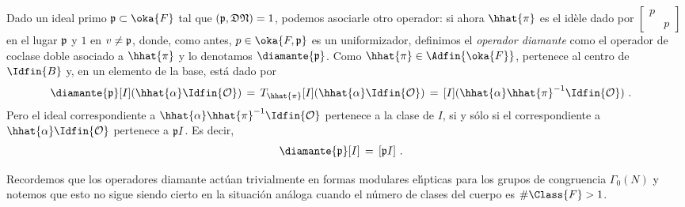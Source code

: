 Dado un ideal primo $\frak{p}\subset\oka{F}$ tal que
$(\frak{p},\frak{D}\frak{N})=1$, podemos asociarle otro operador: si ahora
$\hhat{\pi}$ es el id\`{e}le dado por
\begin{math}
	\begin{bmatrix} p & \\ & p \end{bmatrix}
\end{math}
en el lugar $\frak{p}$ y $1$ en $v\not =\frak{p}$, donde, como antes,
$p\in\oka{F,\frak{p}}$ es un uniformizador, definimos el \emph{operador %
diamante}
como el operador de coclase doble asociado a $\hhat{\pi}$ y lo denotamos
$\diamante{\frak{p}}$. Como $\hhat{\pi}\in\Adfin{\oka{F}}$, pertenece al centro
de $\Idfin{B}$ y, en un elemento de la base, est\'{a} dado por
\begin{align*}
	\diamante{\frak{p}} [I] (\hhat{\alpha}\Idfin{\cal{O}}) & \,=\,
		T_{\hhat{\pi}}[I]
			(\hhat{\alpha}\Idfin{\cal{O}})
		\,=\,[I](\hhat{\alpha}\hhat{\pi}^{-1}\Idfin{\cal{O}})
	\text{ .}
\end{align*}
%
Pero el ideal correspondiente a $\hhat{\alpha}\hhat{\pi}^{-1}\Idfin{\cal{O}}$
pertenece a la clase de $I$, si y s\'{o}lo si el correspondiente a
$\hhat{\alpha}\Idfin{\cal{O}}$ pertenece a $\frak{p}I$.
Es decir,
\begin{align*}
	\diamante{\frak{p}} [I] & \,=\, [\frak{p}I]
	\text{ .}
\end{align*}
%

\begin{obsDiamanteParaDefinidos}\label{obs:diamanteparadefinidos}
	Recordemos que los operadores diamante act\'{u}an trivialmente en
	formas modulares el\'{\i}pticas para los grupos de congruencia
	$\Gamma_{0}(N)$ y notemos que esto no sigue siendo cierto en la
	situaci\'{o}n an\'{a}loga cuando el n\'{u}mero de clases del cuerpo es
	$\#\Class{F}>1$.
\end{obsDiamanteParaDefinidos}


